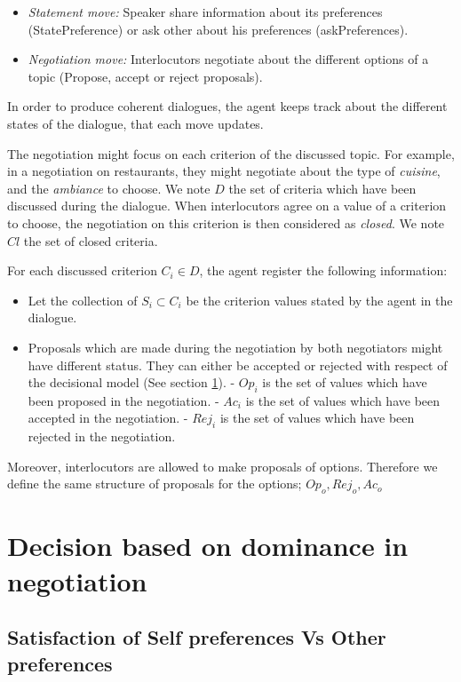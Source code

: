 \documentclass{article}
\begin{document}
		\begin{itemize}
			\item \emph{Statement move:} Speaker share information about its preferences (StatePreference) or ask other about his preferences (askPreferences).
			\item \emph{Negotiation move:} Interlocutors negotiate about the different options of a topic (Propose, accept or reject proposals).
		\end{itemize}
	
	
		 In order to produce coherent dialogues, the agent keeps track about the different states of the dialogue, that each move updates. 
		
		The negotiation might focus on each criterion of the discussed topic. For example, in a negotiation on restaurants, they might negotiate about the type of \textit{cuisine}, and the \textit{ambiance} to choose.  We note $D$ the set of criteria which have been discussed during the dialogue. When interlocutors agree on a value of a criterion to choose, the negotiation on this criterion is then considered as \textit{closed}. We note $Cl$ the set of closed criteria.
		
		For each discussed criterion $C_i \in D$, the agent register the following information:		
		\begin{itemize}
			\item Let the collection of $S_i \subset C_i$ be the criterion values stated by the agent in the dialogue.
			\item Proposals which are made during the negotiation by both negotiators might have different status. They can either be accepted or rejected with respect of the decisional model (See section \ref{decision}).
				\subitem - $Op_i$ is the set of  values which have been proposed in the negotiation.
				\subitem - $Ac_i$  is the set of values which have been accepted in the negotiation.
				\subitem - $Rej_i$  is the set of values which have been rejected in the negotiation.
		\end{itemize}
		
	Moreover, interlocutors are allowed to make proposals of options. Therefore we define the same structure of proposals for the options; $Op_o, Rej_o, Ac_o$

	\section{Decision based on dominance in negotiation}
	\label{decision}
	\subsection{Satisfaction of Self preferences Vs Other preferences}
\end{document}
